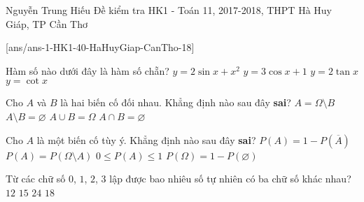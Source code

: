 	\begin{name}
		{Nguyễn Trung Hiếu}
		{Đề kiểm tra HK1 - Toán 11, 2017-2018, THPT Hà Huy Giáp, TP Cần Thơ}
	\end{name}
	\setcounter{ex}{0}\setcounter{bt}{0}
	[ans/ans-1-HK1-40-HaHuyGiap-CanTho-18]
\begin{ex}%
Hàm số nào dưới đây là hàm số chẵn?
\choice
{$y=2\sin x + x^2$}
{\True $y=3\cos x + 1$}
{$y=2\tan x$}
{$y=\cot x$}
\end{ex}
\begin{ex}%
	Cho $A$ và $B$ là hai biến cố đối nhau. Khẳng định nào sau đây \textbf{sai}?
	\choice
	{$A=\Omega \setminus B$}
	{\True $A\setminus B = \varnothing$}
	{$A\cup B = \Omega$}
	{$A\cap B = \varnothing$}
\end{ex}
\begin{ex}%
	Cho $A$ là một biến cố tùy ý. Khẳng định nào sau đây \textbf{sai}?
	\choice
	{$P(A)=1-P(\overline{A})$}
	{\True $P(A)=P(\Omega \setminus A)$}
	{$0\le P(A)\le 1$}
	{$P(\Omega)=1-P(\varnothing)$}
\end{ex}
\begin{ex}%
	Từ các chữ số $0$, $1$, $2$, $3$ lập được bao nhiêu số tự nhiên có ba chữ số khác nhau?
	\choice
	{$12$}
	{$15$}
	{$24$}
	{\True $18$}
\end{ex}
